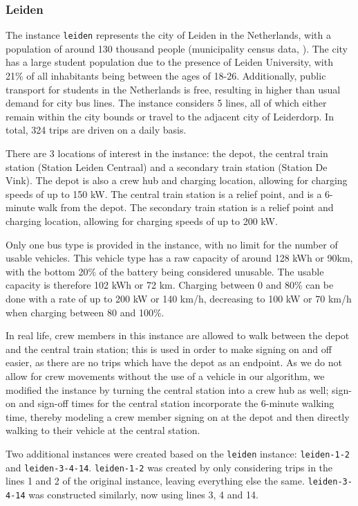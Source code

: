 \documentclass[]{article}
\begin{document}
\subsubsection{Leiden}
The instance \texttt{leiden} represents the city of Leiden in the Netherlands, with a population of around 130 thousand people (municipality census data, \citet{Leiden2025}). The city has a large student population due to the presence of Leiden University, with 21\% of all inhabitants being between the ages of 18-26. Additionally, public transport for students in the Netherlands is free, resulting in higher than usual demand for city bus lines. The instance considers 5 lines, all of which either remain within the city bounds or travel to the adjacent city of Leiderdorp. In total, 324 trips are driven on a daily basis. 

There are 3 locations of interest in the instance: the depot, the central train station (Station Leiden Centraal) and a secondary train station (Station De Vink). The depot is also a crew hub and charging location, allowing for charging speeds of up to 150 kW. The central train station is a relief point, and is a 6-minute walk from the depot. The secondary train station is a relief point and charging location, allowing for charging speeds of up to 200 kW.

Only one bus type is provided in the instance, with no limit for the number of usable vehicles. This vehicle type has a raw capacity of around 128 kWh or 90km, with the bottom 20\% of the battery being considered unusable. The usable capacity is therefore 102 kWh or 72 km. Charging between 0 and 80\% can be done with a rate of up to 200 kW or 140 km/h, decreasing to 100 kW or 70 km/h when charging between 80 and 100\%.

In real life, crew members in this instance are allowed to walk between the depot and the central train station; this is used in order to make signing on and off easier, as there are no trips which have the depot as an endpoint. As we do not allow for crew movements without the use of a vehicle in our algorithm, we modified the instance by turning the central station into a crew hub as well; sign-on and sign-off times for the central station incorporate the 6-minute walking time, thereby modeling a crew member signing on at the depot and then directly walking to their vehicle at the central station. 

Two additional instances were created based on the \texttt{leiden} instance: \texttt{leiden-1-2} and \texttt{leiden-3-4-14}. \texttt{leiden-1-2} was created by only considering trips in the lines 1 and 2 of the original instance, leaving everything else the same. \texttt{leiden-3-4-14} was constructed similarly, now using lines 3, 4 and 14.
\end{document}
